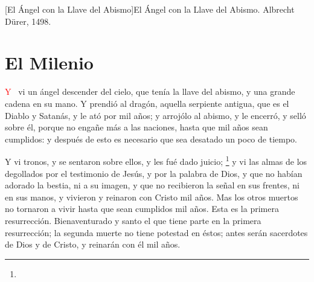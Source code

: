 [El Ángel con la Llave del Abismo]{El Ángel con la Llave del Abismo. Albrecht Dürer, 1498.}

\chapter{El Milenio}
\lettrine[lines=2,slope=-0.5em,loversize=0.1]{\textcolor{red}{Y}}{\ } vi un ángel descender del cielo, que tenía la llave del abismo, y una grande cadena en su mano. 
Y prendió al dragón, aquella serpiente antigua, que es el Diablo y Satanás, y le ató por mil años; 
y arrojólo al abismo, y le encerró,%
 y selló sobre él, porque no engañe más a las naciones, hasta que mil años sean cumplidos: y después de esto es necesario que sea desatado un poco de tiempo.

Y vi tronos, y se sentaron sobre ellos, y les fué dado juicio;%
	\footnote{ %
			  } %
 y vi las almas de los degollados por el testimonio de Jesús, y por la palabra de Dios, y que no habían adorado la bestia, ni a su imagen, y que no recibieron la señal en sus frentes, ni en sus manos, y vivieron%
 y reinaron con Cristo mil años.%
Mas los otros muertos no tornaron a vivir hasta que sean cumplidos mil años. Esta es la primera resurrección.
Bienaventurado y santo el que tiene parte en la primera resurrección; la segunda muerte no tiene potestad en éstos; antes serán sacerdotes de Dios y de Cristo, y reinarán con él mil años.

